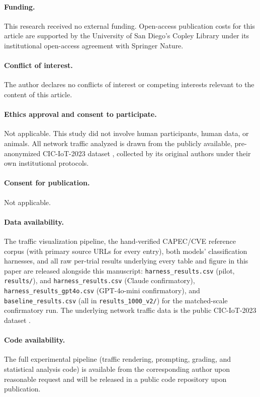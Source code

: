 \documentclass[10pt,twocolumn]{article}
\begin{document}
\paragraph{Funding.} This research received no external funding. Open-access publication costs
for this article are supported by the University of San Diego's Copley Library under its
institutional open-access agreement with Springer Nature.

\paragraph{Conflict of interest.} The author declares no conflicts of interest or competing
interests relevant to the content of this article.

\paragraph{Ethics approval and consent to participate.} Not applicable. This study did not
involve human participants, human data, or animals. All network traffic analyzed is drawn from
the publicly available, pre-anonymized CIC-IoT-2023 dataset \cite{cic-iot-2023}, collected by its
original authors under their own institutional protocols.

\paragraph{Consent for publication.} Not applicable.

\paragraph{Data availability.} The traffic visualization pipeline, the hand-verified CAPEC/CVE
reference corpus (with primary source URLs for every entry), both models' classification
harnesses, and all raw per-trial results underlying every table and figure in this paper are
released alongside this manuscript: \texttt{harness\_results.csv} (pilot, \texttt{results/}), and
\texttt{harness\_results.csv} (Claude confirmatory), \texttt{harness\_results\_gpt4o.csv}
(GPT-4o-mini confirmatory), and \texttt{baseline\_results.csv} (all in
\texttt{results\_1000\_v2/}) for the matched-scale confirmatory run. The underlying network
traffic data is the public CIC-IoT-2023 dataset \cite{cic-iot-2023}.

\paragraph{Code availability.} The full experimental pipeline (traffic rendering, prompting,
grading, and statistical analysis code) is available from the corresponding author upon
reasonable request and will be released in a public code repository upon publication.
\end{document}

